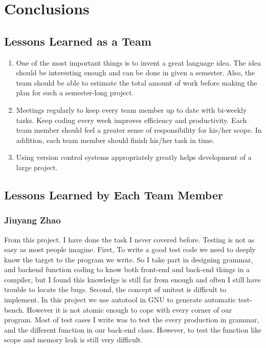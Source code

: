 \section{Conclusions}

\subsection{Lessons Learned as a Team}

\begin{enumerate}
\item
One of the most important things is to invent a great language idea. The idea should be
interesting enough and can be done in given a semester. Also, the team should be able to estimate
the total amount of work before making the plan for such a semester-long project.

\item
Meetings regularly to keep every team member up to date with bi-weekly tasks. Keep coding every
week improves efficiency and productivity. Each team member should feel a greater sense of
responsibility for his/her scope. In addition, each team member should finish his/her task in time.

\item
Using version control systems appropriately greatly helps development of a large project.
\end{enumerate}

\subsection{Lessons Learned by Each Team Member}

\subsubsection{Jiuyang Zhao}

From this project. I have done the task I never covered before. Testing is not as easy as most
people imagine. First, To write a good test code we need to deeply know the target to the program we
write. So I take part in designing grammar, and backend function coding to know both front-end and
back-end things in a compiler, but I found this knowledge is still far from enough and often I still
have trouble to locate the bugs.  Second, the concept of unitest is difficult to implement. In this
project we use autotool in GNU to generate automatic test-bench. However it is not atomic enough to
cope with every corner of our program. Most of test cases I write was to test the every production
in grammar, and the different function in our back-end class. However, to test the function like
scope and memory leak is still very difficult. 

